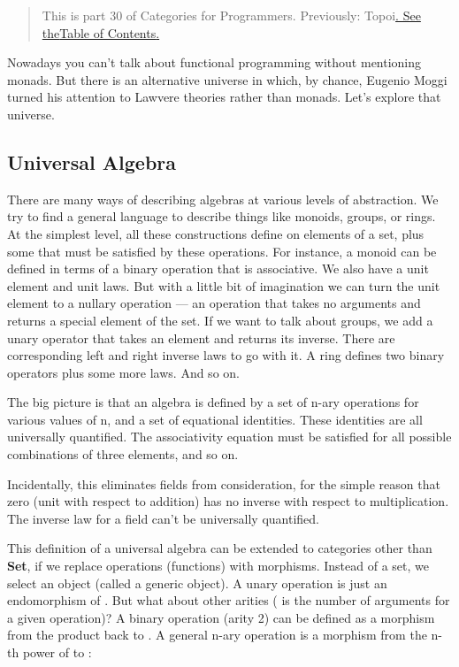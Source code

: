 \begin{quote}
This is part 30 of Categories for Programmers. Previously:
{Topoi}\href{https://bartoszmilewski.com/2017/07/22/topoi/}{. See
the}\href{https://bartoszmilewski.com/2014/10/28/category-theory-for-programmers-the-preface/}{Table
of Contents}\href{https://bartoszmilewski.com/2017/07/22/topoi/}{.}
\end{quote}

Nowadays you can't talk about functional programming without mentioning
monads. But there is an alternative universe in which, by chance,
Eugenio Moggi turned his attention to Lawvere theories rather than
monads. Let's explore that universe.

\subsection{Universal Algebra}\label{universal-algebra}

There are many ways of describing algebras at various levels of
abstraction. We try to find a general language to describe things like
monoids, groups, or rings. At the simplest level, all these
constructions define  on elements of a set, plus some
 that must be satisfied by these operations. For instance, a
monoid can be defined in terms of a binary operation that is
associative. We also have a unit element and unit laws. But with a
little bit of imagination we can turn the unit element to a nullary
operation --- an operation that takes no arguments and returns a special
element of the set. If we want to talk about groups, we add a unary
operator that takes an element and returns its inverse. There are
corresponding left and right inverse laws to go with it. A ring defines
two binary operators plus some more laws. And so on.

The big picture is that an algebra is defined by a set of n-ary
operations for various values of n, and a set of equational identities.
These identities are all universally quantified. The associativity
equation must be satisfied for all possible combinations of three
elements, and so on.

Incidentally, this eliminates fields from consideration, for the simple
reason that zero (unit with respect to addition) has no inverse with
respect to multiplication. The inverse law for a field can't be
universally quantified.

This definition of a universal algebra can be extended to categories
other than \textbf{Set}, if we replace operations (functions) with
morphisms. Instead of a set, we select an object  (called a
generic object). A unary operation is just an endomorphism of
. But what about other arities ( is the number of
arguments for a given operation)? A binary operation (arity 2) can be
defined as a morphism from the product  back to .
A general n-ary operation is a morphism from the n-th power of
 to :

